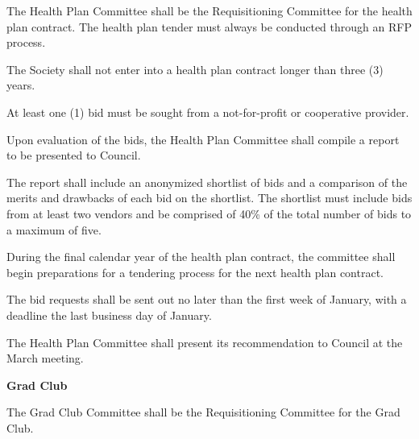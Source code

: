 \begin{longenum}[label*=\thesection.\arabic*., align=left]
\begin{longenum} [label*=\arabic*., align=left]
		\begin{longenum} [label*=\arabic*., align=left]
			\item The Health Plan Committee shall be the Requisitioning Committee for the health plan contract. The health plan tender must always be conducted through an RFP process.
		\item 	The Society shall not enter into a health plan contract longer than three (3) years.
		\item 	At least one (1) bid must be sought from a not-for-profit or cooperative provider.
		\item Upon evaluation of the bids, the Health Plan Committee shall compile a report to be presented to Council.
		\item The  report  shall  include  an  anonymized  shortlist  of  bids  and  a  comparison  of  the  merits  and  drawbacks  of  each  bid  on  the  shortlist.  The  shortlist  must  include  bids  from  at  least  two  vendors  and  be  comprised  of  40\%  of  the  total  number  of  bids  to  a  maximum  of  five.
		\item During the final calendar year of the health plan contract, the committee shall begin preparations for a tendering process for the next health plan contract.
		\item 	The bid requests shall be sent out no later than the first week of January, with a deadline the last business day of January.
		\item 	The Health Plan Committee shall present its recommendation to Council at the
March meeting.
	\end{longenum}	
	
\item \textbf{Grad Club}

\begin{longenum} [label*=\arabic*., align=left]
	\item The Grad Club Committee shall be the Requisitioning Committee for the Grad Club.
\end{longenum}	


\end{longenum}

\end{longenum}
